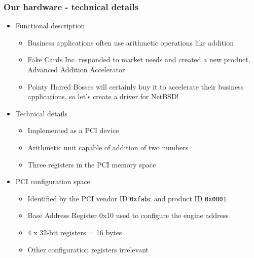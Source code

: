 \documentclass[dvipsnames,table]{beamer}
\begin{document}
\begin{frame}
\frametitle{Our hardware - technical details}

\begin{itemize}
\item Functional description
\begin{itemize}
	\item Business applications often use arithmetic operations like addition
	\item Fake Cards Inc. responded to market needs and created a new product, Advanced Addition Accelerator
	\item Pointy Haired Bosses will certainly buy it to accelerate their business applications, so let's create a driver for NetBSD!
\end{itemize}
\item Technical details
\begin{itemize}
	\item Implemented as a PCI device
	\item Arithmetic unit capable of addition of two numbers
	\item Three registers in the PCI memory space
\end{itemize}
\item PCI configuration space
\begin{itemize}
	\item Identified by the PCI vendor ID {\tt 0xfabc} and product ID {\tt 0x0001}
	\item Base Address Register 0x10 used to configure the engine address 
	\item 4 x 32-bit registers = 16 bytes
	\item Other configuration registers irrelevant
\end{itemize}
\end{itemize}
\end{frame}
\end{document}
